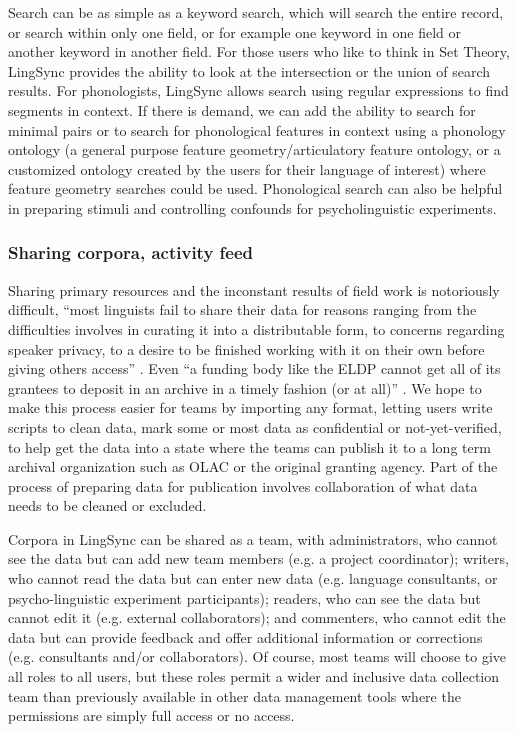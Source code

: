 \documentclass[letterpaper, 12pt, dvips]{mitwpl}
\begin{document}
Search can be as simple as a keyword search,
which will search the entire record,
or search within only one field,
or for example one keyword in one field or another keyword in another field.
For those users who like to think in Set Theory, LingSync provides the ability to look at the intersection or the union of search results. 
For phonologists, LingSync allows search using regular expressions to find segments in context.
If there is demand, we can add the ability to search for minimal pairs or to search for phonological features in context using a phonology ontology (a general purpose feature geometry/articulatory feature ontology,
or a customized ontology created by the users for their language of interest)  where feature geometry searches could be used.
Phonological search can also be helpful in %
preparing stimuli and controlling confounds for psycholinguistic experiments.


\subsubsection{Sharing corpora,
activity feed}
\label{sec:sharingactivityfeeds}

Sharing primary resources and the inconstant results of field work is notoriously difficult, 
``most linguists fail to share their data for reasons ranging from the difficulties involves in curating it into a distributable form, to concerns regarding speaker privacy, to a desire to be finished working with it on their own before giving others access'' \citep{Bender:2010}. Even ``a funding body like the ELDP cannot get all of its grantees to deposit in an archive in a timely fashion (or at all)'' \citep{Thieberger:2012}. We hope to make this process easier  for teams by importing any format, letting users write scripts to clean data, mark some or most data as confidential or not-yet-verified, to help get the data into a state where the teams can publish it to a long term archival organization such as OLAC or the original granting agency. Part of the process of preparing data for publication involves collaboration of what data needs to be cleaned or excluded.


Corpora in LingSync can be shared as a team,
with administrators,
who cannot see the data
but can add new team members (e.g.
a project coordinator); writers,
who cannot read the data but can enter new data (e.g.
language consultants,
or psycho-linguistic experiment participants); readers,
who can see the data but cannot edit it (e.g.
external collaborators); and commenters,
 who cannot edit the data but can provide feedback and offer additional information or corrections (e.g.
consultants and/or collaborators).
 Of course,
most teams will choose to give all roles to all users,
but these roles permit a wider and inclusive data collection team than previously available  in other data management tools where the permissions are simply full access or no access.
\end{document}
